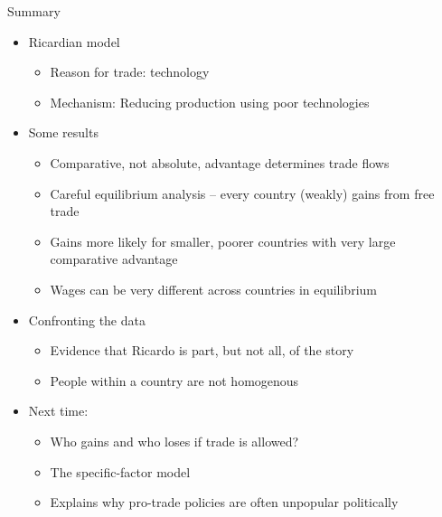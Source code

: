\documentclass[ignorenonframetext,]{beamer}
\begin{document}
\begin{frame}{Summary}

    \begin{itemize}
        \item Ricardian model
        \begin{itemize}
            \item Reason for trade: technology
            \item Mechanism: Reducing production using poor technologies
        \end{itemize}
        \item Some results
        \begin{itemize}
            \item Comparative, not absolute, advantage determines trade flows 
            \item Careful equilibrium analysis -- every country (weakly) gains from free trade
            \item Gains more likely for smaller, poorer countries with very large comparative advantage
            \item Wages can be very different across countries in equilibrium
        \end{itemize}
        \item Confronting the data
        \begin{itemize}
            \item Evidence that Ricardo is part, but not all, of the story
            \item People within a country are not homogenous
        \end{itemize}
    \end{itemize}

\end{frame}

\begin{frame}

    \begin{itemize}
        \item Next time:
            \begin{itemize}
                \item Who gains and who loses if trade is allowed?
                \item The specific-factor model
                \item Explains why pro-trade policies are often unpopular politically
            \end{itemize}
    \end{itemize}

\end{frame}
\end{document}
